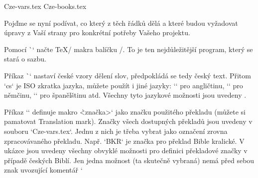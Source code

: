 \def\tmark     {BKR}    %

 {Cze-vars.tex}   %
 {Cze-books.tex}  %

\def\txsfile     {sources/Cze\tmark-\amark.txs}     %
\def\fmtfile     {formats/fmt-Cze\tmark-\amark.tex} %
\def\notesfile   {notes/notes-\amark.tex}           %
\def\introfile   {others/intro-\amark.tex}          %
\def\articlefile {others/articles-\amark.tex}       %

\def\printedbooks {%
   Gn Ex Lv Nu Dt Joz Sd Rt 1Sa 2Sa 1Kr 2Kr 1Pa 2Pa Ezd Neh
   Est Jb Ž Př Kaz Pís Iz Jr Pl Ez Da Oz Jl Am Abd Jon Mi
   Na Abk Sf Ag Za Mal 
   Mt Mk Lk Jn Sk Ř 1K 2K Ga Ef Fp Ko 1Te 2Te 1Tm 2Tm 
   Tt Fm Žd Jk 1Pt 2Pt 1Jn 2Jn 3Jn Ju Zj
}
\processbooks %
\bye
\endtt

Pojďme se nyní podívat, co který z těch řádků dělá a které budou vyžadovat úpravy z Vaší strany pro konkrétní  potřeby Vašeho projektu.

Pomocí \`\load[opbible]` načte \TeX/ makra balíčku \OpBible/. To je ten nejdůležitější program, který se stará o sazbu.

Příkaz \`\cslang` nastaví české vzory dělení slov, předpokládá se tedy český
text. Přitom `cs` je ISO zkratka jazyka, můžete použít i jiné jazyky:
`\enlang` pro angličtinu, `\delang` pro němčinu, `\eslang` pro španělštinu
atd. Všechny tyto jazykové možnosti jsou uvedeny . %

Příkaz `\def\tmark {<značka>}` definuje makro \`\tmark` jako značku
použitého překladu (můžete si pamatovat Translation mark). Značky všech dostupných překladů jsou uvedeny v souboru
`Cze-vars.tex`. Jednu z nich je třeba vybrat jako označení zrovna zpracovávaného
překladu. Např. `BKR` je značka pro překlad Bible kralické.
V ukázce jsou uvedeny všechny obvyklé možnosti pro definici překladové značky v případě českých Biblí. Jen jedna možnost (ta skutečně vybraná) nemá před sebou znak uvozující komentář `%

